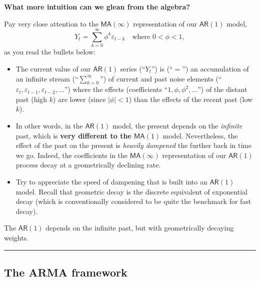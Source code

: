 \documentclass[
  letterpaper,
  DIV=11,
  numbers=noendperiod]{scrartcl}
\newcommand{\slidelabel}[1]{{\color{embernavy}\bfseries\large #1\par\vspace{5pt}}}
\newenvironment{slidefooter}{%
  \par\vspace{7pt}{\color{emberrule}\rule{\linewidth}{0.4pt}}\par\vspace{4pt}%
  \color{emberamber}\itshape\small}{\par}
\begin{document}
\begin{slidebox}

\slidelabel{What more intuition can we glean from the algebra?}

Pay very close attention to the \(\mathsf{MA}(\infty)\) representation
of our \(\mathsf{AR}(1)\) model,
\[Y_t = \sum_{k=0}^{\infty}\phi^k\varepsilon_{t-k} \quad \text{where } 0 < \phi < 1,\]
as you read the bullets below:

\begin{itemize}
\item
  The current value of our \(\mathsf{AR}(1)\) series (``\(Y_t\)'') is
  (``\(=\)'') an accumulation of an infinite stream
  (``\(\sum_{k=0}^{\infty}\)'') of current and past noise elements
  (``\(\varepsilon_t, \varepsilon_{t-1}, \varepsilon_{t-2}, \ldots\)'')
  where the effects (coefficients ``\(1, \phi, \phi^2, \ldots\)'') of
  the distant past (high \(k\)) are lower (since \(|\phi| < 1\)) than
  the effects of the recent past (low \(k\)).
\item
  In other words, in the \(\mathsf{AR}(1)\) model, the present depends
  on the \emph{infinite} past, which is \textbf{very different to the
  \(\mathsf{MA}(1)\)} model. Nevertheless, the effect of the past on the
  present is \emph{heavily dampened} the further back in time we go.
  Indeed, the coefficients in the \(\mathsf{MA}(\infty)\) representation
  of our \(\mathsf{AR}(1)\) process decay at a geometrically declining
  rate.
\item
  Try to appreciate the speed of dampening that is built into an
  \(\mathsf{AR}(1)\) model. Recall that geometric decay is the discrete
  equivalent of exponential decay (which is conventionally considered to
  be quite the benchmark for fast decay).
\end{itemize}

\begin{slidefooter}

The \(\mathsf{AR}(1)\) depends on the infinite past, but with
geometrically decaying weights.

\end{slidefooter}

\end{slidebox}

\begin{center}\rule{0.5\linewidth}{0.5pt}\end{center}

\subsection{The ARMA framework}\label{the-arma-framework}
\end{document}
